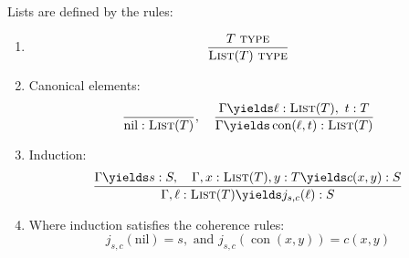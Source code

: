 \documentclass{article}
\newcommand\TYPE{\text{ \scshape{type}}}
\newcommand\LIST{\textsc{List}}
\newcommand\nil{\textrm{nil}}
\newcommand\con{\operatorname{con}}
\begin{document}
Lists are defined by the rules:
\begin{enumerate}
    \item \[\frac{T\TYPE}{\LIST(T)\TYPE}\]
    \item Canonical elements:
        \[\frac{}{\nil:\LIST(T)},\quad 
        \frac{\Gamma \yields \ell:\LIST(T),\ t:T}{
            \Gamma \yields \con(\ell,t) : \LIST(T)
            }
        \]
    \item Induction:
        \[ \frac{\Gamma\yields s:S,\quad 
            \Gamma, x:\LIST(T), y:T\yields c(x,y):S }{
                \Gamma,\ell:\LIST(T)\yields j_{s,c}(\ell):S
            }
            \]
    \item Where induction satisfies the coherence rules:
        \[j_{s,c}(\nil)=s,\text{ and } j_{s,c}(\con(x,y))=c(x,y)
        \]
\end{enumerate}
\end{document}
